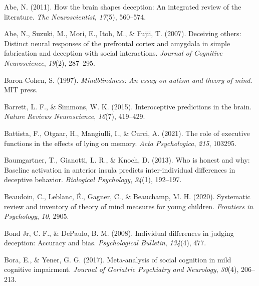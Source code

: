 \documentclass[
  man,mask,floatsintext]{apa6}
\newlength{\cslhangindent}
\newlength{\cslentryspacingunit} %
\newenvironment{CSLReferences}[2] %
 {%
  \setlength{\parindent}{0pt}
  \ifodd #1
  \let\oldpar\par
  \def\par{\hangindent=\cslhangindent\oldpar}
  \fi
  \setlength{\parskip}{#2\cslentryspacingunit}
 }%
 {}
\begin{document}
\hypertarget{refs}{}
\begin{CSLReferences}{1}{0}
\leavevmode{}%
Abe, N. (2011). How the brain shapes deception: An integrated review of the literature. \emph{The Neuroscientist}, \emph{17}(5), 560--574.

\leavevmode{}%
Abe, N., Suzuki, M., Mori, E., Itoh, M., \& Fujii, T. (2007). Deceiving others: Distinct neural responses of the prefrontal cortex and amygdala in simple fabrication and deception with social interactions. \emph{Journal of Cognitive Neuroscience}, \emph{19}(2), 287--295.

\leavevmode{}%
Baron-Cohen, S. (1997). \emph{Mindblindness: An essay on autism and theory of mind}. MIT press.

\leavevmode{}%
Barrett, L. F., \& Simmons, W. K. (2015). Interoceptive predictions in the brain. \emph{Nature Reviews Neuroscience}, \emph{16}(7), 419--429.

\leavevmode{}%
Battista, F., Otgaar, H., Mangiulli, I., \& Curci, A. (2021). The role of executive functions in the effects of lying on memory. \emph{Acta Psychologica}, \emph{215}, 103295.

\leavevmode{}%
Baumgartner, T., Gianotti, L. R., \& Knoch, D. (2013). Who is honest and why: Baseline activation in anterior insula predicts inter-individual differences in deceptive behavior. \emph{Biological Psychology}, \emph{94}(1), 192--197.

\leavevmode{}%
Beaudoin, C., Leblanc, É., Gagner, C., \& Beauchamp, M. H. (2020). Systematic review and inventory of theory of mind measures for young children. \emph{Frontiers in Psychology}, \emph{10}, 2905.

\leavevmode{}%
Bond Jr, C. F., \& DePaulo, B. M. (2008). Individual differences in judging deception: Accuracy and bias. \emph{Psychological Bulletin}, \emph{134}(4), 477.

\leavevmode{}%
Bora, E., \& Yener, G. G. (2017). Meta-analysis of social cognition in mild cognitive impairment. \emph{Journal of Geriatric Psychiatry and Neurology}, \emph{30}(4), 206--213.


\end{CSLReferences}
\end{document}
